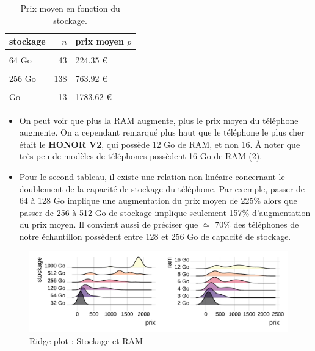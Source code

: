 \documentclass[
  12pt,
]{report}
\begin{document}
\begin{table}[!h]

\caption{\label{tab:kable_2}Prix moyen en fonction du stockage.}
\centering
\begin{tabular}[t]{lrl}
\toprule
\textbf{stockage} & \textbf{$n$} & \textbf{prix moyen $\bar p$}\\
\midrule
\cellcolor{gray!6}{32 Go} & \cellcolor{gray!6}{16} & \cellcolor{gray!6}{100.09 €}\\
64 Go & 43 & 224.35 €\\
\cellcolor{gray!6}{128 Go} & \cellcolor{gray!6}{173} & \cellcolor{gray!6}{507.96 €}\\
256 Go & 138 & 763.92 €\\
\cellcolor{gray!6}{512 Go} & \cellcolor{gray!6}{49} & \cellcolor{gray!6}{1199.34 €}\\
\addlinespace
1000 Go & 13 & 1783.62 €\\
\bottomrule
\end{tabular}
\end{table}

\begin{itemize}
\item
  On peut voir que plus la RAM augmente, plus le prix moyen du téléphone
  augmente. On a cependant remarqué plus haut que le téléphone le plus
  cher était le \textbf{HONOR V2}, qui possède 12 Go de RAM, et non 16.
  À noter que très peu de modèles de téléphones possèdent 16 Go de RAM
  (2).
\item
  Pour le second tableau, il existe une relation non-linéaire concernant
  le doublement de la capacité de stockage du téléphone. Par exemple,
  passer de 64 à 128 Go implique une augmentation du prix moyen de 225\%
  alors que passer de 256 à 512 Go de stockage implique seulement 157\%
  d'augmentation du prix moyen. Il convient aussi de préciser que
  \(\simeq\) 70\% des téléphones de notre échantillon possèdent entre
  128 et 256 Go de capacité de stockage.
\end{itemize}

\begin{figure}[H]

{\centering \includegraphics{report_files/figure-pdf/ggplots-1.pdf}

}

\caption{Ridge plot : Stockage et RAM}

\end{figure}%
\end{document}
